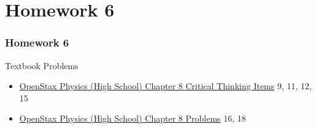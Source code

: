 \documentclass[20pt]{beamer}
\begin{document}
\section{Homework 6}

\begin{frame}
	\frametitle{Homework 6}
	\begin{block}{Textbook Problems}
		\begin{itemize}
			\item \href{https://openstax.org/books/physics/pages/8-critical-thinking-items}{OpenStax Physics (High School) Chapter 8 Critical Thinking Items} 9, 11, 12, 15
			\item \href{https://openstax.org/books/physics/pages/8-problems}{OpenStax Physics (High School) Chapter 8 Problems} 16, 18
		\end{itemize}
	\end{block}
\end{frame}
\end{document}
